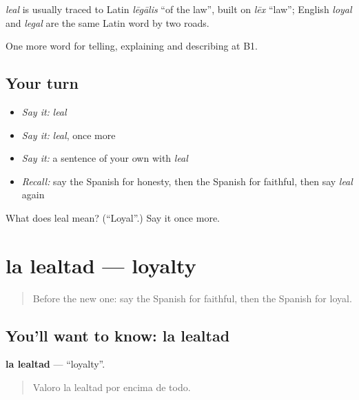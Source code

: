 \begin{cousinweb}
\emph{leal} is usually traced to Latin \emph{lēgālis} \textquotedblleft{}of the law\textquotedblright{}, built on \emph{lēx} \textquotedblleft{}law\textquotedblright{}; English \emph{loyal} and \emph{legal} are the same Latin word by two roads.
\end{cousinweb}

\begin{grammarlens}[title={What you've built}]
One more word for telling, explaining and describing at B1.
\end{grammarlens}

\subsection*{Your turn}
\begin{itemize}
\raggedright
  \item \emph{Say it:} \emph{leal}
  \item \emph{Say it:} \emph{leal}, once more
  \item \emph{Say it:} a sentence of your own with \emph{leal}
  \item \emph{Recall:} say the Spanish for honesty, then the Spanish for faithful, then say \emph{leal} again
\end{itemize}

\begin{tcolorbox}[breakable,colback=teal!4,colframe=teal!35!black,title={Before you move on}]
What does leal mean? (\textquotedblleft{}Loyal\textquotedblright{}.) Say it once more.
\end{tcolorbox}
\section[la lealtad]{la lealtad — loyalty}

\label{lesson:ES-C725-lealtad}



\begin{quote}
Before the new one: say the Spanish for faithful, then the Spanish for loyal.
\end{quote}

\subsection*{You'll want to know: la lealtad}
\textbf{la lealtad} — \textquotedblleft{}loyalty\textquotedblright{}.

\begin{quote}
Valoro la lealtad por encima de todo.
\end{quote}

